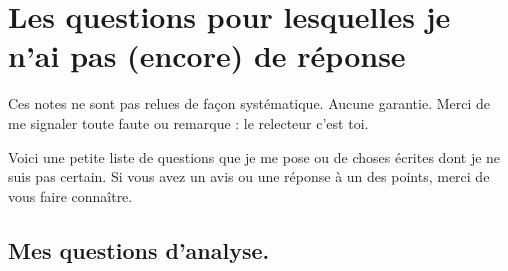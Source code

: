 
\section{Les questions pour lesquelles je n'ai pas (encore) de réponse}

Ces notes ne sont pas relues de façon systématique. Aucune garantie. Merci de me signaler toute faute ou remarque : le relecteur c'est toi.

Voici une petite liste de questions que je me pose ou de choses écrites dont je ne suis pas certain. Si vous avez un avis ou une réponse à un des points, merci de vous faire connaître.

\subsection{Mes questions d'analyse.}

